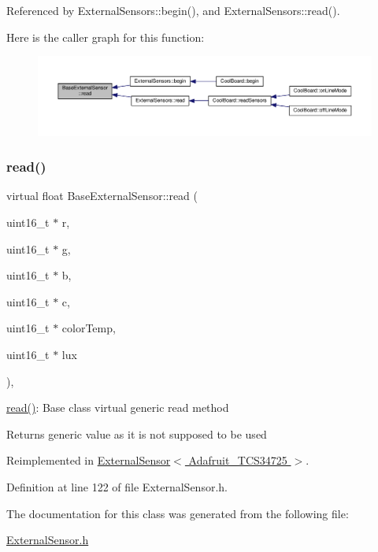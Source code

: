 Referenced by External\+Sensors\+::begin(), and External\+Sensors\+::read().

Here is the caller graph for this function\+:
\nopagebreak
\begin{figure}[H]
\begin{center}
\leavevmode
\includegraphics[width=350pt]{d1/d68/class_base_external_sensor_a1564f16deacf57b51b9948ac29db4291_icgraph}
\end{center}
\end{figure}
\mbox{\label{class_base_external_sensor_ab1f906fc55c0cc2c55a38a85167199ee}} 
\subsubsection{\texorpdfstring{read()}{read()}\hspace{0.1cm}{\footnotesize\ttfamily [2/2]}}
{\footnotesize\ttfamily virtual float Base\+External\+Sensor\+::read (\begin{DoxyParamCaption}\item[{uint16\+\_\+t $\ast$}]{r,  }\item[{uint16\+\_\+t $\ast$}]{g,  }\item[{uint16\+\_\+t $\ast$}]{b,  }\item[{uint16\+\_\+t $\ast$}]{c,  }\item[{uint16\+\_\+t $\ast$}]{color\+Temp,  }\item[{uint16\+\_\+t $\ast$}]{lux }\end{DoxyParamCaption})\hspace{0.3cm}{\ttfamily [inline]}, {\ttfamily [virtual]}}

\hyperlink{class_base_external_sensor_a1564f16deacf57b51b9948ac29db4291}{read()}\+: Base class virtual generic read method

\begin{DoxyReturn}{Returns}
generic value as it is not supposed to be used 
\end{DoxyReturn}


Reimplemented in \hyperlink{class_external_sensor_3_01_adafruit___t_c_s34725_01_4_a0d020129b78253b2929e33c0148631cd}{External\+Sensor$<$ Adafruit\+\_\+\+T\+C\+S34725 $>$}.



Definition at line 122 of file External\+Sensor.\+h.



The documentation for this class was generated from the following file\+:\begin{DoxyCompactItemize}
\item 
\hyperlink{_external_sensor_8h}{External\+Sensor.\+h}\end{DoxyCompactItemize}
